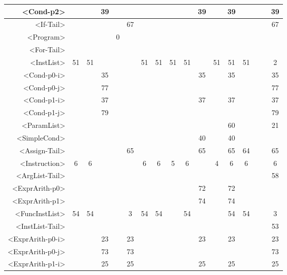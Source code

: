 \begin{tabular}{r|c@{ }c@{ }c@{ }c@{ }c@{ }c@{ }c@{ }c@{ }c@{ }c@{ }c@{ }c@{ }c@{ }c@{ }c@{ }c@{ }}
<Cond-p2> &   &   & 39 &   &   &   &   &   &   & 39 &   & 39 &   &   &   & 39 \\\hline
<If-Tail> &   &   &   &   & 67 &   &   &   &   &   &   &   &   &   &   & 67 \\\hline
<Program> &   &   &   & 0 &   &   &   &   &   &   &   &   &   &   &   &   \\\hline
<For-Tail> &   &   &   &   &   &   &   &   &   &   &   &   &   &   &   &   \\\hline
<InstList> & 51 & 51 &   &   &   & 51 & 51 & 51 & 51 &   & 51 & 51 & 51 &   &   & 2 \\\hline
<Cond-p0-i> &   &   & 35 &   &   &   &   &   &   & 35 &   & 35 &   &   &   & 35 \\\hline
<Cond-p0-j> &   &   & 77 &   &   &   &   &   &   &   &   &   &   &   &   & 77 \\\hline
<Cond-p1-i> &   &   & 37 &   &   &   &   &   &   & 37 &   & 37 &   &   &   & 37 \\\hline
<Cond-p1-j> &   &   & 79 &   &   &   &   &   &   &   &   &   &   &   &   & 79 \\\hline
<ParamList> &   &   &   &   &   &   &   &   &   &   &   & 60 &   &   &   & 21 \\\hline
<SimpleCond> &   &   &   &   &   &   &   &   &   & 40 &   & 40 &   &   &   &   \\\hline
<Assign-Tail> &   &   &   &   & 65 &   &   &   &   & 65 &   & 65 & 64 &   &   & 65 \\\hline
<Instruction> & 6 & 6 &   &   &   & 6 & 6 & 5 & 6 &   & 4 & 6 & 6 &   &   & 6 \\\hline
<ArgList-Tail> &   &   &   &   &   &   &   &   &   &   &   &   &   &   &   & 58 \\\hline
<ExprArith-p0> &   &   &   &   &   &   &   &   &   & 72 &   & 72 &   &   &   &   \\\hline
<ExprArith-p1> &   &   &   &   &   &   &   &   &   & 74 &   & 74 &   &   &   &   \\\hline
<FuncInstList> & 54 & 54 &   &   & 3 & 54 & 54 &   & 54 &   &   & 54 & 54 &   &   & 3 \\\hline
<InstList-Tail> &   &   &   &   &   &   &   &   &   &   &   &   &   &   &   & 53 \\\hline
<ExprArith-p0-i> &   &   & 23 &   & 23 &   &   &   &   & 23 &   & 23 &   &   &   & 23 \\\hline
<ExprArith-p0-j> &   &   & 73 &   & 73 &   &   &   &   &   &   &   &   &   &   & 73 \\\hline
<ExprArith-p1-i> &   &   & 25 &   & 25 &   &   &   &   & 25 &   & 25 &   &   &   & 25 \\\hline

\end{tabular}
